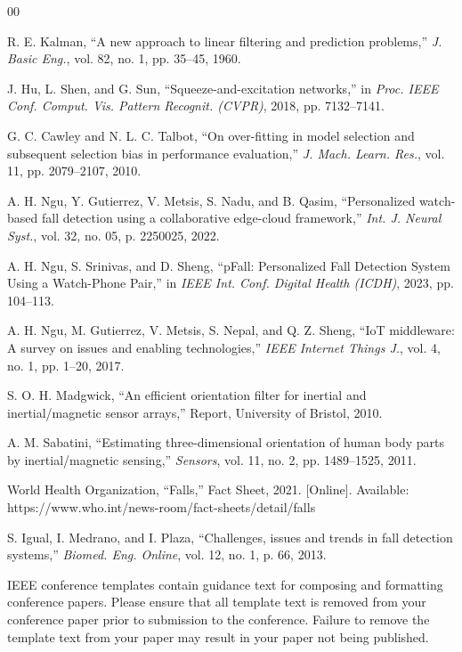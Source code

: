 \documentclass[conference]{IEEEtran}
\begin{document}
\begin{thebibliography}{00}

 R. E. Kalman, ``A new approach to linear filtering and prediction problems,'' \textit{J. Basic Eng.}, vol. 82, no. 1, pp. 35--45, 1960.

 J. Hu, L. Shen, and G. Sun, ``Squeeze-and-excitation networks,'' in \textit{Proc. IEEE Conf. Comput. Vis. Pattern Recognit. (CVPR)}, 2018, pp. 7132--7141.

 G. C. Cawley and N. L. C. Talbot, ``On over-fitting in model selection and subsequent selection bias in performance evaluation,'' \textit{J. Mach. Learn. Res.}, vol. 11, pp. 2079--2107, 2010.

 A. H. Ngu, Y. Gutierrez, V. Metsis, S. Nadu, and B. Qasim, ``Personalized watch-based fall detection using a collaborative edge-cloud framework,'' \textit{Int. J. Neural Syst.}, vol. 32, no. 05, p. 2250025, 2022.

 A. H. Ngu, S. Srinivas, and D. Sheng, ``pFall: Personalized Fall Detection System Using a Watch-Phone Pair,'' in \textit{IEEE Int. Conf. Digital Health (ICDH)}, 2023, pp. 104--113.

 A. H. Ngu, M. Gutierrez, V. Metsis, S. Nepal, and Q. Z. Sheng, ``IoT middleware: A survey on issues and enabling technologies,'' \textit{IEEE Internet Things J.}, vol. 4, no. 1, pp. 1--20, 2017.

 S. O. H. Madgwick, ``An efficient orientation filter for inertial and inertial/magnetic sensor arrays,'' Report, University of Bristol, 2010.

 A. M. Sabatini, ``Estimating three-dimensional orientation of human body parts by inertial/magnetic sensing,'' \textit{Sensors}, vol. 11, no. 2, pp. 1489--1525, 2011.

 World Health Organization, ``Falls,'' Fact Sheet, 2021. [Online]. Available: https://www.who.int/news-room/fact-sheets/detail/falls

 S. Igual, I. Medrano, and I. Plaza, ``Challenges, issues and trends in fall detection systems,'' \textit{Biomed. Eng. Online}, vol. 12, no. 1, p. 66, 2013.

\end{thebibliography}
\vspace{12pt}
\color{red}
IEEE conference templates contain guidance text for composing and formatting conference papers. Please ensure that all template text is removed from your conference paper prior to submission to the conference. Failure to remove the template text from your paper may result in your paper not being published.
\end{document}
